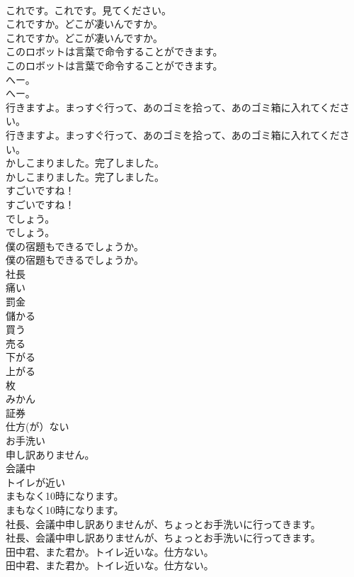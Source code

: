 \documentclass[8pt]{extreport}
\begin{document}
\begin{CJK}{UTF8}{min}
\\	これです。これです。見てください。 
\\	これですか。どこが凄いんですか。	
\\	これですか。どこが凄いんですか。 
\\	このロボットは言葉で命令することができます。	
\\	このロボットは言葉で命令することができます。 
\\	へー。	
\\	へー。 
\\	行きますよ。まっすぐ行って、あのゴミを拾って、あのゴミ箱に入れてください。	
\\	行きますよ。まっすぐ行って、あのゴミを拾って、あのゴミ箱に入れてください。 
\\	かしこまりました。完了しました。	
\\	かしこまりました。完了しました。 
\\	すごいですね！	
\\	すごいですね！ 
\\	でしょう。	
\\	でしょう。 
\\	僕の宿題もできるでしょうか。	
\\	僕の宿題もできるでしょうか。 
\\	社長
\\	痛い
\\	罰金
\\	儲かる
\\	買う
\\	売る
\\	下がる
\\	上がる
\\	枚
\\	みかん
\\	証券
\\	仕方(が）ない
\\	お手洗い
\\	申し訳ありません。
\\	会議中
\\	トイレが近い
\\	まもなく10時になります。	
\\	まもなく10時になります。 
\\	社長、会議中申し訳ありませんが、ちょっとお手洗いに行ってきます。	
\\	社長、会議中申し訳ありませんが、ちょっとお手洗いに行ってきます。 
\\	田中君、また君か。トイレ近いな。仕方ない。	
\\	田中君、また君か。トイレ近いな。仕方ない。 

\end{CJK}
\end{document}
